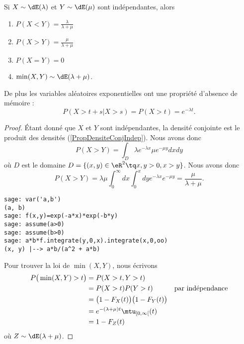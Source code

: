 \begin{proposition}
	Si \( X\sim\dE(\lambda)\) et \( Y\sim\dE(\mu)\) sont indépendantes, alors
	\begin{enumerate}
		\item
		      \( P(X<Y)=\frac{ \lambda }{ \lambda+\mu }\)
		\item
		      \( P(X>Y)=\frac{ \mu }{ \lambda+\mu }\)
		\item
		      \( P(X=Y)=0\)
		\item
		      \( \min(X,Y)\sim\dE(\lambda+\mu)\).
	\end{enumerate}
	De plus les variables aléatoires exponentielles ont une propriété d'absence de mémoire :
	\begin{equation}
		P(X>t+s|X>s)=P(X>t)= e^{-\lambda t}.
	\end{equation}
\end{proposition}

\begin{proof}
	Étant donné que \( X\) et \( Y\) sont indépendantes, la densité conjointe est le produit des densités (\ref{PropDensiteConjIndep}). Nous avons donc
	\begin{equation}
		P(X>Y)=\int_D\lambda e^{-\lambda x}\mu e^{-\mu y}dxdy
	\end{equation}
	où \( D\) est le domaine \( D=\{ (x,y)\in \eR^2\tq x,y>0, x>y \}\). Nous avons donc
	\begin{equation}
		P(X>Y)=\lambda\mu\int_0^{\infty}dx\int_0^xdy  e^{-\lambda x} e^{-\mu y}=\frac{ \mu }{ \lambda+\mu }.
	\end{equation}
	\begin{verbatim}
sage: var('a,b')
(a, b)
sage: f(x,y)=exp(-a*x)*exp(-b*y)
sage: assume(a>0)
sage: assume(b>0)
sage: a*b*f.integrate(y,0,x).integrate(x,0,oo)
(x, y) |--> a*b/(a^2 + a*b)
    \end{verbatim}

	Pour trouver la loi de \( \min(X,Y)\), nous écrivons
	\begin{subequations}
		\begin{align}
			P\big( \min(X,Y)>t \big) & =P(X>t,Y>t)                                                                      \\
			                         & =P(X>t)P(Y>t)                                          & \text{par indépendance} \\
			                         & =\big( 1-F_X(t) \big)\big( 1-F_Y(t) \big)                                        \\
			                         & = e^{-(\lambda+\mu)t}\mtu_{\mathopen[ 0 , \infty [}(t)                           \\
			                         & =1-F_Z(t)
		\end{align}
	\end{subequations}
	où \( Z\sim \dE(\lambda+\mu)\).
\end{proof}

